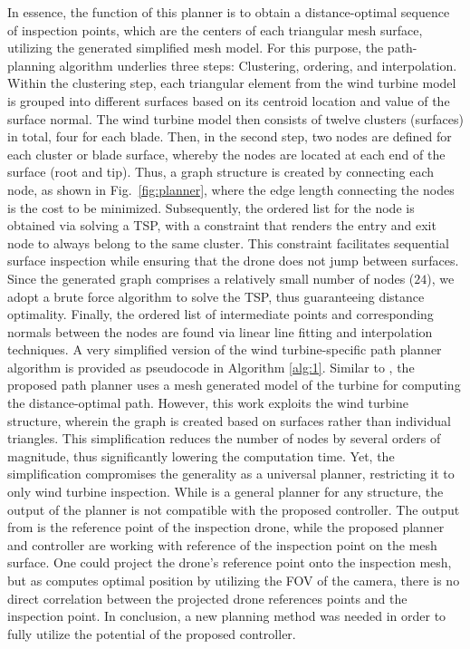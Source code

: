 In essence, the function of this planner is to obtain a distance-optimal sequence of inspection points, which are the centers of each triangular mesh surface, utilizing the generated simplified mesh model. For this purpose, the path-planning algorithm underlies three steps: Clustering, ordering, and interpolation. Within the clustering step, each triangular element from the wind turbine model is grouped into different surfaces based on its centroid location and value of the surface normal. The wind turbine model then consists of twelve clusters (surfaces) in total, four for each blade. Then, in the second step, two nodes are defined for each cluster or blade surface, whereby the nodes are located at each end of the surface (root and tip). Thus, a graph structure is created by connecting each node, as shown in Fig.~\ref{fig:planner}, where the edge length connecting the nodes is the cost to be minimized. Subsequently, the ordered list for the node is obtained via solving a \ac{TSP}, with a constraint that renders the entry and exit node to always belong to the same cluster. This constraint facilitates sequential surface inspection while ensuring that the drone does not jump between surfaces. Since the generated graph comprises a relatively small number of nodes ($24$), we adopt a brute force algorithm to solve the \ac{TSP}, thus guaranteeing distance optimality. Finally, the ordered list of intermediate points and corresponding normals between the nodes are found via linear line fitting and interpolation techniques. A very simplified version of the wind turbine-specific path planner algorithm is provided as pseudocode in Algorithm \ref{alg:1}.
Similar to \cite{SIP}, the proposed path planner uses a mesh generated model of the turbine for computing the distance-optimal path. However, this work exploits the wind turbine structure, wherein the graph is created based on surfaces rather than individual triangles. This simplification reduces the number of nodes by several orders of magnitude, thus significantly lowering the computation time. 
Yet, the simplification compromises the generality as a universal planner, restricting it to only wind turbine inspection.%
While  \cite{SIP} is a general planner for any structure, the output of the planner is not compatible with the proposed controller. The output from \cite{SIP} is the reference point of the inspection drone, while the proposed planner and controller are working with reference of the inspection point on the mesh surface. One could project the drone's reference point onto the inspection mesh, but as \cite{SIP} computes optimal position by utilizing the FOV of the camera, there is no direct correlation between the projected drone references points and the inspection point. In conclusion, a new planning method was needed in order to fully utilize the potential of the proposed controller. 




